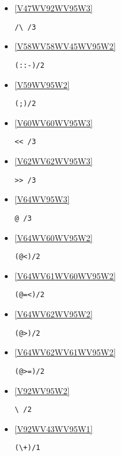 \begin{itemize}
\item \ref{V47WV92WV95W3} 
\begin{verbatim}
/\ /3
\end{verbatim}

\item \ref{V58WV58WV45WV95W2} 
\begin{verbatim}
(::-)/2
\end{verbatim}

\item \ref{V59WV95W2} 
\begin{verbatim}
(;)/2
\end{verbatim}

\item \ref{V60WV60WV95W3} 
\begin{verbatim}
<< /3
\end{verbatim}

\item \ref{V62WV62WV95W3} 
\begin{verbatim}
>> /3
\end{verbatim}

\item \ref{V64WV95W3} 
\begin{verbatim}
@ /3
\end{verbatim}

\item \ref{V64WV60WV95W2} 
\begin{verbatim}
(@<)/2
\end{verbatim}

\item \ref{V64WV61WV60WV95W2} 
\begin{verbatim}
(@=<)/2
\end{verbatim}

\item \ref{V64WV62WV95W2} 
\begin{verbatim}
(@>)/2
\end{verbatim}

\item \ref{V64WV62WV61WV95W2} 
\begin{verbatim}
(@>=)/2
\end{verbatim}

\item \ref{V92WV95W2} 
\begin{verbatim}
\ /2
\end{verbatim}

\item \ref{V92WV43WV95W1} 
\begin{verbatim}
(\+)/1
\end{verbatim}


\end{itemize}
